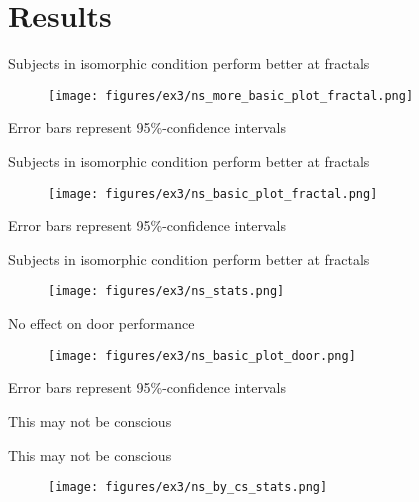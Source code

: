 \documentclass{beamer}
\begin{document}
\section{Results}
\begin{frame}{Subjects in isomorphic condition perform better at fractals}
\begin{figure}
\centering
\texttt{[image: figures/ex3/ns\_more\_basic\_plot\_fractal.png]}
\end{figure}
{\scriptsize Error bars represent 95\%-confidence intervals}
\end{frame}

\begin{frame}{Subjects in isomorphic condition perform better at fractals}
\begin{figure}
\centering
\texttt{[image: figures/ex3/ns\_basic\_plot\_fractal.png]}
\end{figure}
{\scriptsize Error bars represent 95\%-confidence intervals}
\end{frame}

\begin{frame}{Subjects in isomorphic condition perform better at fractals}
\begin{figure}
\centering
\texttt{[image: figures/ex3/ns\_stats.png]}
\end{figure}
\end{frame}

\begin{frame}{No effect on door performance}
\begin{figure}
\centering
\texttt{[image: figures/ex3/ns\_basic\_plot\_door.png]}
\end{figure}
{\scriptsize Error bars represent 95\%-confidence intervals}
\end{frame}

\begin{frame}{This may not be conscious}
\begin{figure}
\centering
{}
\end{figure}
\vspace{-5pt}
\end{frame}

\begin{frame}{This may not be conscious}
\begin{figure}
\centering
\texttt{[image: figures/ex3/ns\_by\_cs\_stats.png]}
\end{figure}
\end{frame}
\end{document}
